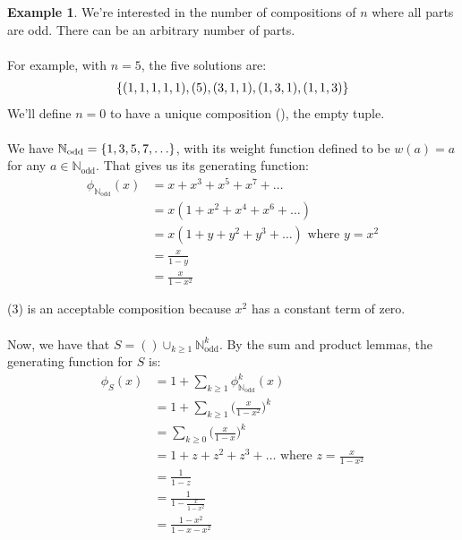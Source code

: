 \documentclass[]{article}
\theoremstyle{definition}
\newtheorem{ex}{Example}[section]
\DeclarePairedDelimiter{\set}{\lbrace}{\rbrace}
\begin{document}
				\begin{ex}
					We're interested in the number of compositions of $n$ where all parts are odd. There can be an arbitrary number of parts.
					\\ \\
					For example, with $n = 5$, the five solutions are:
					\begin{align*}
						\set{(1, 1, 1, 1, 1), (5), (3, 1, 1), (1, 3, 1), (1, 1, 3) }
					\end{align*}
					We'll define $n = 0$ to have a unique composition (), the empty tuple.
					\\ \\
					We have $\mathbb{N}_{\text{odd}} = \set{1, 3, 5, 7, \ldots}$, with its weight function defined to be $w(a) = a$ for any $a \in \mathbb{N}_{\text{odd}}$. That gives us its generating function:
					\setcounter{equation}{0}
					\begin{align}
						\phi_{\mathbb{N}_{\text{odd}}}(x) &= x + x^3 + x^5 + x^7 + \ldots \\
						&= x(1 + x^2 + x^4 + x^6 + \ldots) \\
						&= x(1 + y + y^2 + y^3 + \ldots) \text{ where } y = x^2 \\
						&= \frac{x}{1 - y} \\
						&= \frac{x}{1 - x^2}
					\end{align}

					(3) is an acceptable composition because $x^2$ has a constant term of zero.
					\\ \\
					Now, we have that $S = () \cup_{k \ge 1} \mathbb{N}_{\text{odd}}^k$. By the sum and product lemmas, the generating function for $S$ is:
					\setcounter{equation}{0}
					\begin{align}
						\phi_S(x) &= 1 + \sum_{k \ge 1} \phi_{\mathbb{N}_{\text{odd}}}^k(x) \\
						&= 1 + \sum_{k \ge 1} \bigg( \frac{x}{1 - x^2} \bigg)^k \\
						&= \sum_{k \ge 0} \bigg( \frac{x}{1 - x} \bigg)^k \\
						&= 1 + z + z^2 + z^3 + \ldots \text{ where } z = \frac{x}{1 - x^2} \\
						&= \frac{1}{1 - z} \\
						&= \frac{1}{1 - \frac{x}{1 - x^2}} \\
						&= \frac{1 - x^2}{1 - x - x^2}
					\end{align}


\end{ex}
\end{document}
